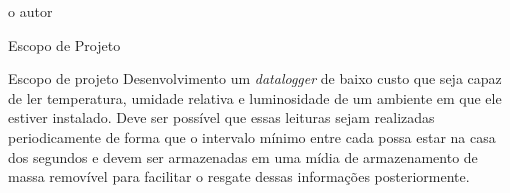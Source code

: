 \begin{frame}
\begin{table}[!h]
        	\captionsetup{width=7cm}%
        	\caption{\textit{Dataloggers: Propriedades}}%
        	\resizebox{\linewidth}{!}{
        		\begin{tabular}{ccccccc}
        			\toprule
        			Modelo & Dimensões & Autonomia & Faixa de Leitura (ºC) & Precisão (ºC) & Umidade Relativa (\%) & Precisão(\%)\\
        			\midrule \midrule
                   RCW-360        & Não informado   & 3 meses       & -35 a 80 & 0,5 & 0 a 99 & 5    \\
                   EL-WiFi-TH     & 82 x 70 x 23 mm & 6 meses       & -20 a 60 & 0,3 & 0 a 100 & 2    \\
                   TandD RTR-507B & 62 x 47 x 19 mm & 10 meses      & -25 a 70 & 0,3 & 0 a 99  & 2,50 \\
                   160 TH         & 76 x 64 x 22 mm & Não informado & -30 a 50 & 0,1 & 0 a 100 & 2   
                    \\
        	    \bottomrule
        		\end{tabular}%
        	}
                \tiny{o autor}\\
            \end{table}
\end{frame}

\begin{frame}{Escopo de Projeto}

    \begin{block}{Escopo de projeto}
        Desenvolvimento um \textit{datalogger} de baixo custo que seja capaz de ler temperatura, umidade relativa e luminosidade de um ambiente em que ele estiver instalado. Deve ser possível que essas leituras sejam realizadas periodicamente de forma que o intervalo mínimo entre cada possa estar na casa dos segundos e devem ser armazenadas em uma mídia de armazenamento de massa removível para facilitar o resgate dessas informações posteriormente.
    \end{block}
    
\end{frame}





